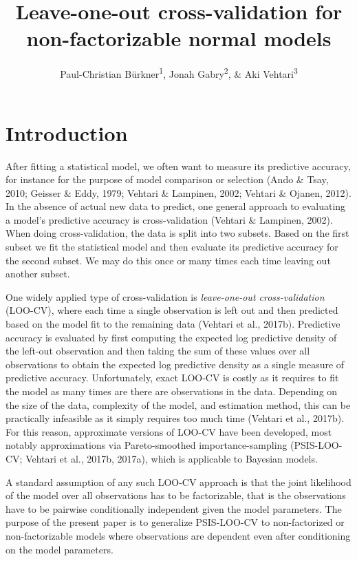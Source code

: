 \documentclass[english,,doc,floatsintext]{apa6}
\title{Leave-one-out cross-validation for non-factorizable normal models}
\author{Paul-Christian Bürkner\textsuperscript{1}, Jonah
Gabry\textsuperscript{2}, \& Aki Vehtari\textsuperscript{3}}
\date{}
\affiliation{
\vspace{0.5cm}
\textsuperscript{1} Department of Psychology, University of Münster, Germany\\\textsuperscript{2} Institute for Social and Economic Research in Policy, Columbia University, USA\\\textsuperscript{3} Department of Computer Science, Aalto University, Finland}
\theoremstyle{definition}
\theoremstyle{definition}
\theoremstyle{definition}
\theoremstyle{remark}
\begin{document}
\maketitle

\hypertarget{introduction}{%
\section{Introduction}\label{introduction}}

After fitting a statistical model, we often want to measure its
predictive accuracy, for instance for the purpose of model comparison or
selection (Ando \& Tsay, 2010; Geisser \& Eddy, 1979; Vehtari \&
Lampinen, 2002; Vehtari \& Ojanen, 2012). In the absence of actual new
data to predict, one general approach to evaluating a model's predictive
accuracy is cross-validation (Vehtari \& Lampinen, 2002). When doing
cross-validation, the data is split into two subsets. Based on the first
subset we fit the statistical model and then evaluate its predictive
accuracy for the second subset. We may do this once or many times each
time leaving out another subset.

One widely applied type of cross-validation is \emph{leave-one-out
cross-validation} (LOO-CV), where each time a single observation is left
out and then predicted based on the model fit to the remaining data
(Vehtari et al., 2017b). Predictive accuracy is evaluated by first
computing the expected log predictive density of the left-out
observation and then taking the sum of these values over all
observations to obtain the expected log predictive density as a single
measure of predictive accuracy. Unfortunately, exact LOO-CV is costly as
it requires to fit the model as many times are there are observations in
the data. Depending on the size of the data, complexity of the model,
and estimation method, this can be practically infeasible as it simply
requires too much time (Vehtari et al., 2017b). For this reason,
approximate versions of LOO-CV have been developed, most notably
approximations via Pareto-smoothed importance-sampling (PSIS-LOO-CV;
Vehtari et al., 2017b, 2017a), which is applicable to Bayesian models.

A standard assumption of any such LOO-CV approach is that the joint
likelihood of the model over all observations has to be factorizable,
that is the observations have to be pairwise conditionally independent
given the model parameters. The purpose of the present paper is to
generalize PSIS-LOO-CV to non-factorized or non-factorizable models
where observations are dependent even after conditioning on the model
parameters.
\end{document}
